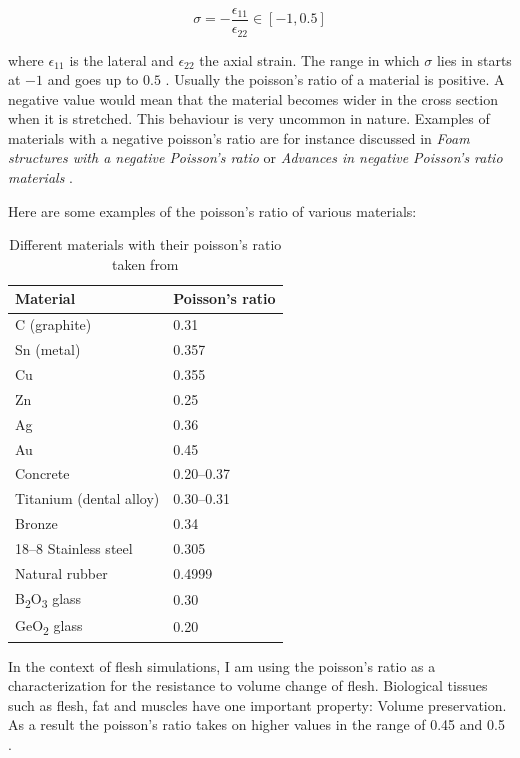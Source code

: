 \begin{equation}\label{eq:poisson}
\sigma = - \frac{\epsilon_{11}}{\epsilon_{22}} \in [-1, 0.5]
\end{equation}

where $\epsilon_{11}$ is the lateral and $\epsilon_{22}$ the axial strain. The range in which $\sigma$ lies in starts at $-1$ and goes up to $0.5$ \cite{PhysRevB.80.132104}. Usually the poisson's ratio of a material is positive. A negative value would mean that the material becomes wider in the cross section when it is stretched. This behaviour is very uncommon in nature. Examples of materials with a negative poisson's ratio are for instance discussed in \textit{Foam structures with a negative Poisson's ratio} \cite{lakes1987foam} or \textit{Advances in negative Poisson's ratio materials} \cite{lakes1993advances}.

Here are some examples of the poisson's ratio of various materials:

\begin{table}[!htbp]
\centering
    \begin{tabular}{ | l | l |}
    \hline
    \textbf{Material} & \textbf{Poisson's ratio} \\ \hline
    C (graphite) & 0.31 \\ \hline
    Sn (metal) & 0.357 \\ \hline
    Cu & 0.355 \\ \hline
    Zn & 0.25 \\ \hline
    Ag & 0.36 \\ \hline
    Au & 0.45 \\ \hline
    Concrete & 0.20–0.37 \\ \hline
    Titanium (dental alloy) & 0.30–0.31 \\ \hline
    Bronze & 0.34 \\ \hline
    18–8 Stainless steel & 0.305 \\ \hline
    Natural rubber & 0.4999 \\ \hline
	B\textsubscript{2}O\textsubscript{3} glass & 0.30 \\ \hline
	GeO\textsubscript{2} glass & 0.20 \\ \hline	
    \end{tabular}
    \caption{Different materials with their poisson's ratio taken from \cite{PhysRevB.80.132104}}
\label{table:1}
\end{table}

In the context of flesh simulations, I am using the poisson's ratio as a characterization for the resistance to volume change of flesh. Biological tissues such as flesh, fat and muscles have one important property: Volume preservation. As a result the poisson's ratio takes on higher values in the range of 0.45 and 0.5 \cite{Smith:2018:SNF:3191713.3180491}.

